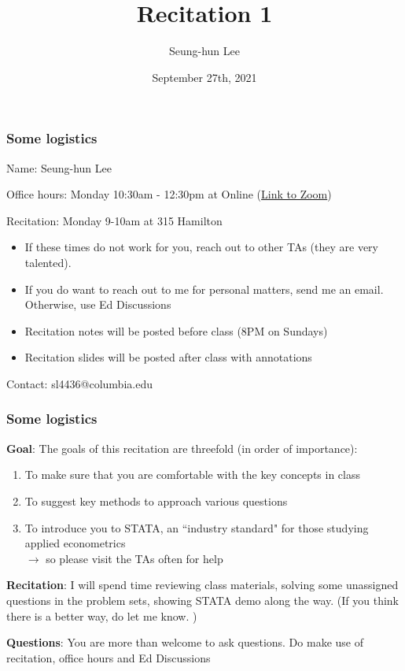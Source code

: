 \documentclass[aspectratio=169]{beamer}
\title[Recitation 1]{Recitation 1} %
\author[Seung-hun Lee]{Seung-hun Lee}
\institute[Columbia University]{Columbia University}
\date[September 27th, 2021]{September 27th, 2021}
\newenvironment{wideitemize}{\itemize\addtolength{\itemsep}{10pt}}{\enditemize}
\begin{document}
\begin{frame}
\titlepage
\end{frame}



\begin{frame}
\frametitle{Some logistics}
\begin{wideitemize}
\item Name: Seung-hun Lee
\item Office hours: Monday 10:30am - 12:30pm at Online (\href{https://columbiauniversity.zoom.us/j/96949225512?pwd=bTgwKytIVHpmNVloU0hNOEFxQ3J3UT09}{Link to Zoom})
\item Recitation: Monday 9-10am at 315 Hamilton
\begin{itemize}
\item  If these times do not work for you, reach out to other TAs (they are very talented).
\item If you do want to reach out to me for personal matters, send me an email. \\ Otherwise, use Ed Discussions
\item Recitation notes will be posted before class (8PM on Sundays)
\item Recitation slides will be posted after class with annotations
\end{itemize}
\item Contact: sl4436@columbia.edu
 \end{wideitemize}
\end{frame}

\begin{frame}
\frametitle{Some logistics}
\begin{wideitemize}
\item  \textbf{Goal}: The goals of this recitation are threefold (in order of importance): 
\begin{enumerate}
\item To make sure that you are comfortable with the key concepts in class
\item To suggest key methods to approach various questions
\item To introduce you to STATA, an ``industry standard" for those studying applied econometrics\\
$\to$ so please visit the TAs often for help
\end{enumerate}
\item \textbf{Recitation}: I will spend time reviewing class materials, solving some unassigned questions in the problem sets, showing STATA demo along the way. (If you think there is a better way, do let me know. )
\item  \textbf{Questions}: You are more than welcome to ask questions. Do make use of recitation, office hours and Ed Discussions
\end{wideitemize}
\end{frame}
\end{document}
